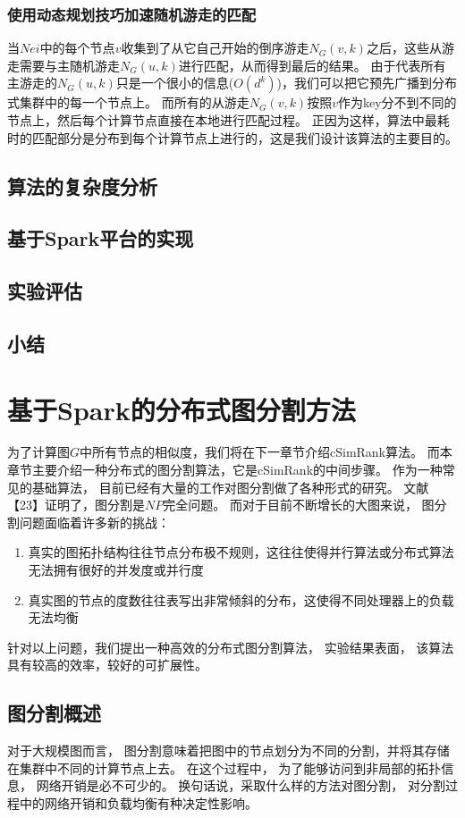 \documentclass[master]{njuthesis}
\begin{document}
\subsection{使用动态规划技巧加速随机游走的匹配}
当$Nei$中的每个节点$v$收集到了从它自己开始的倒序游走$N_{G}(v, k)$之后，这些从游走需要与主随机游走$N_{G}(u, k)$进行匹配，从而得到最后的结果。
由于代表所有主游走的$N_{G}(u, k)$只是一个很小的信息($O(d^k)$)，我们可以把它预先广播到分布式集群中的每一个节点上。
而所有的从游走$N_{G}(v, k)$按照$v$作为key分不到不同的节点上，然后每个计算节点直接在本地进行匹配过程。
正因为这样，算法中最耗时的匹配部分是分布到每个计算节点上进行的，这是我们设计该算法的主要目的。
\section{算法的复杂度分析}
\section{基于Spark平台的实现}
\section{实验评估}
\section{小结}

\chapter{基于Spark的分布式图分割方法}\label{chapter_graphpartition}
为了计算图$G$中所有节点的相似度，我们将在下一章节介绍cSimRank算法。 而本章节主要介绍一种分布式的图分割算法，它是cSimRank的中间步骤。
作为一种常见的基础算法， 目前已经有大量的工作对图分割做了各种形式的研究。 文献【23】证明了，图分割是$NP$完全问题。
而对于目前不断增长的大图来说， 图分割问题面临着许多新的挑战：
\begin{enumerate}
 \item 真实的图拓扑结构往往节点分布极不规则，这往往使得并行算法或分布式算法无法拥有很好的并发度或并行度
 \item 真实图的节点的度数往往表写出非常倾斜的分布，这使得不同处理器上的负载无法均衡
\end{enumerate}
针对以上问题，我们提出一种高效的分布式图分割算法， 实验结果表面， 该算法具有较高的效率，较好的可扩展性。

\section{图分割概述}
对于大规模图而言， 图分割意味着把图中的节点划分为不同的分割，并将其存储在集群中不同的计算节点上去。
在这个过程中， 为了能够访问到非局部的拓扑信息， 网络开销是必不可少的。 换句话说，采取什么样的方法对图分割，
对分割过程中的网络开销和负载均衡有种决定性影响。
\end{document}
